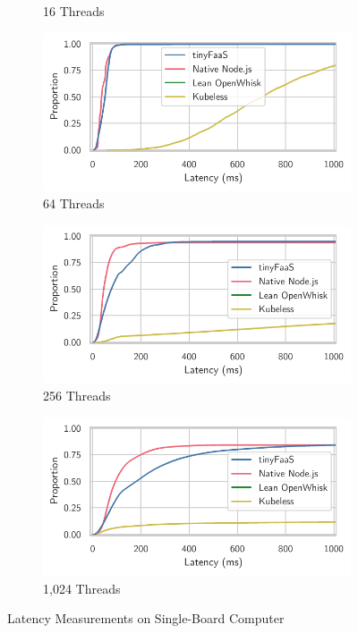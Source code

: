 \begin{figure}
\begin{subfigure}{0.49\linewidth}
        \caption{16 Threads}
        \label{fig:pigraph:16}
    \end{subfigure}
    \hfill
    \begin{subfigure}{0.49\linewidth}
        \centering
        \includegraphics[width=\linewidth]{./fig/ecdf-pi-64.pdf}
        \caption{64 Threads}
        \label{fig:pigraph:64}
    \end{subfigure}
    \vfill
    \begin{subfigure}{0.49\linewidth}
        \centering
        \includegraphics[width=\linewidth]{./fig/ecdf-pi-256.pdf}
        \caption{256 Threads}
        \label{fig:pigraph:256}
    \end{subfigure}
    \hfill
    \begin{subfigure}{0.49\linewidth}
        \centering
        \includegraphics[width=\linewidth]{./fig/ecdf-pi-1024.pdf}
        \caption{1,024 Threads}
        \label{fig:pigraph:1024}
    \end{subfigure}
    \caption{Latency Measurements on Single-Board Computer}
    \label{fig:pigraph}
\end{figure}

